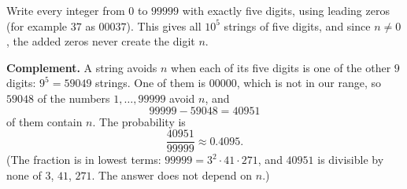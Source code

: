 Write every integer from $0$ to $99999$ with exactly five digits, using leading zeros (for example $37$ as $00037$). This gives all $10^5$ strings of five digits, and since $n\ne0$, the added zeros never create the digit $n$.

\textbf{Complement.} A string avoids $n$ when each of its five digits is one of the other $9$ digits: $9^5=59049$ strings. One of them is $00000$, which is not in our range, so $59048$ of the numbers $1,\dots,99999$ avoid $n$, and
\[99999-59048=40951\]
of them contain $n$. The probability is
\[\boxed{\dfrac{40951}{99999}}\approx0.4095.\]
(The fraction is in lowest terms: $99999=3^2\cdot41\cdot271$, and $40951$ is divisible by none of $3$, $41$, $271$. The answer does not depend on $n$.)

